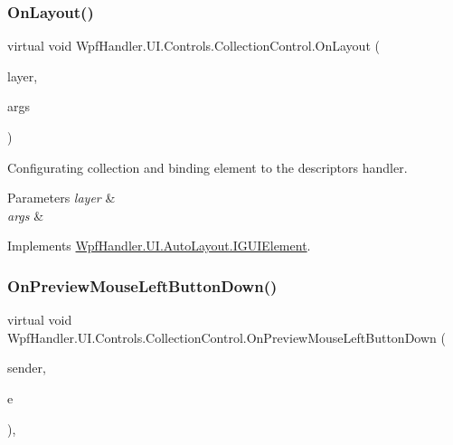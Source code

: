 \subsubsection{\texorpdfstring{On\+Layout()}{OnLayout()}}
{\footnotesize\ttfamily virtual void Wpf\+Handler.\+U\+I.\+Controls.\+Collection\+Control.\+On\+Layout (\begin{DoxyParamCaption}\item[{ref \mbox{\hyperlink{class_wpf_handler_1_1_u_i_1_1_auto_layout_1_1_layout_layer}{Layout\+Layer}}}]{layer,  }\item[{params object \mbox{[}$\,$\mbox{]}}]{args }\end{DoxyParamCaption})\hspace{0.3cm}{\ttfamily [virtual]}}



Configurating collection and binding element to the descriptors handler. 


\begin{DoxyParams}{Parameters}
{\em layer} & \\
\hline
{\em args} & \\
\hline
\end{DoxyParams}


Implements \mbox{\hyperlink{interface_wpf_handler_1_1_u_i_1_1_auto_layout_1_1_i_g_u_i_element_a0ff16956f8e8187d51e1b36b6b9f894e}{Wpf\+Handler.\+U\+I.\+Auto\+Layout.\+I\+G\+U\+I\+Element}}.

\mbox{\label{class_wpf_handler_1_1_u_i_1_1_controls_1_1_collection_control_ad6c991f82c204e789f32f21d28d48524}} 
\subsubsection{\texorpdfstring{On\+Preview\+Mouse\+Left\+Button\+Down()}{OnPreviewMouseLeftButtonDown()}}
{\footnotesize\ttfamily virtual void Wpf\+Handler.\+U\+I.\+Controls.\+Collection\+Control.\+On\+Preview\+Mouse\+Left\+Button\+Down (\begin{DoxyParamCaption}\item[{object}]{sender,  }\item[{Mouse\+Button\+Event\+Args}]{e }\end{DoxyParamCaption})\hspace{0.3cm}{\ttfamily [protected]}, {\ttfamily [virtual]}}



